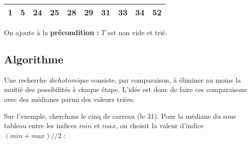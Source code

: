 \vspace{-4ex}
\begin{center}
\begin{minipage}{8.5cm}
\begin{tabular}{|c|c|c|c|c|c|c|c|c|c|}
\hline
\small 1&\small 5&\small 24&\small 25&\small 28&\small 29&\small 31&\small 33&\small 34&\small 52\\
\hline
\end{tabular}
\medskip

\end{minipage}\end{center}

On ajoute à la {\bfseries précondition :} $T$ est non vide et trié.


\subsection{Algorithme}

Une recherche \emph{dichotomique} consiste, par comparaison, à éliminer au moins la moitié des possibilités à chaque étape. L'idée est donc de faire ces comparaisons avec des médianes parmi des valeurs triées. 

Sur l'exemple, cherchons le cinq de carreau (le 31). Pour la médiane du sous tableau entre les indices $min$ et $max$, on choisit la valeur d'indice $(min+max)//2$ :

